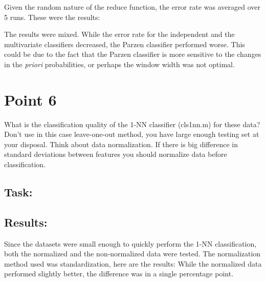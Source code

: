 \documentclass[
  a4paper,            %
  DIV=10,             %
  oneside,            %
  BCOR=5mm,           %
  parskip=half,       %
  numbers=noenddot,   %
  bibtotoc,           %
  listof=totoc        %
]{scrreprt}
\begin{document}
Given the random nature of the reduce function, the error rate was averaged over 5 runs.
These were the results:

The results were mixed.
While the error rate for the independent and the multivariate classifiers decreased, the Parzen classifier performed worse.
This could be due to the fact that the Parzen classifier is more sensitive to the changes in the \textit{priori} probabilities, or perhaps the window width was not optimal.
\section*{Point 6}
What is the classification quality of the 1-NN classifier (cls1nn.m) for these data?
\\
Don't use in this case leave-one-out method, you have large enough testing set at your disposal.
Think about data normalization.
If there is big difference in standard deviations between features you should normalize data before classification.
\subsection*{Task:}
\subsection*{Results:}
Since the datasets were small enough to quickly perform the 1-NN classification, both the normalized and the non-normalized data were tested.
The normalization method used was standardization, here are the results:
While the normalized data performed slightly better, the difference was in a single percentage point.
\end{document}
